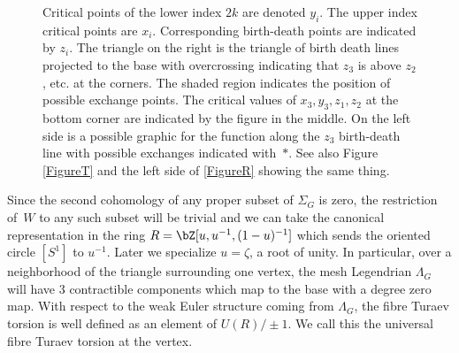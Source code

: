\documentclass[JEP,XML,SOM,Unicode,NoFloatCountersInSection]{cedram}
\theoremstyle{plain}
\theoremstyle{definition}
\begin{document}
\begin{figure}[htbp]
\begin{center}
\caption{\smaller Critical points of the lower index $2k$ are denoted $y_i$. The upper index critical points are $x_i$. Corresponding birth-death points are indicated by $z_i$. The triangle on the right is the triangle of birth death lines projected to the base with overcrossing indicating that $z_3$ is above $z_2$, etc. at the corners. The shaded region indicates the position of possible exchange points. The critical values of $x_3,y_3,z_1,z_2$ at the bottom corner are indicated by the figure in the middle. On the left side is a possible graphic for the function along the $z_3$ birth-death line with possible exchanges indicated with~$\ast$. See also Figure \ref{FigureT} and the left side of \ref{FigureR} showing the same thing.
}
\label{Fig: birth-death triangle}
\end{center}
\end{figure}

Since the second cohomology of any proper subset of $\Sigma_G$ is zero, the restriction of~$W$ to any such subset will be trivial and we can take the canonical representation in the ring $R=\bZ[u,u^{-1},(1-u)^{-1}]$ which sends the oriented circle $[S^1]$ to $u^{-1}$. Later we specialize $u=\zeta$, a root of unity. In particular, over a neighborhood of the triangle surrounding one vertex, the mesh Legendrian $\Lambda_G$ will have 3 contractible components which map to the base with a degree zero map. With respect to the weak Euler structure coming from $\Lambda_G$, the fibre Turaev torsion is well defined as an element of $U(R)/\pm1$.
We call this the universal fibre Turaev torsion at the vertex.
\end{document}
